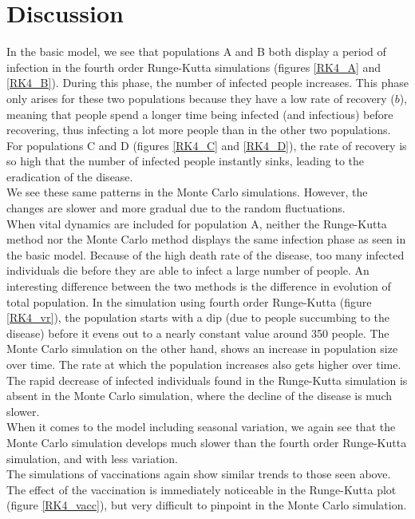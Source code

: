 \documentclass[notitlepage, reprint, nofootinbib]{revtex4-1}
\begin{document}
\section{Discussion}
In the basic model, we see that populations A and B both display a period of infection in the fourth order Runge-Kutta simulations (figures \ref{RK4_A} and \ref{RK4_B}). During this phase, the number of infected people increases. This phase only arises for these two populations because they have a low rate of recovery ($b$), meaning that people spend a longer time being infected (and infectious) before recovering, thus infecting a lot more people than in the other two populations. For populations C and D (figures \ref{RK4_C} and \ref{RK4_D}), the rate of recovery is so high that the number of infected people instantly sinks, leading to the eradication of the disease.\\[2mm]
We see these same patterns in the Monte Carlo simulations. However, the changes are slower and more gradual due to the random fluctuations.\\[2mm]
When vital dynamics are included for population A, neither the Runge-Kutta method nor the Monte Carlo method displays the same infection phase as seen in the basic model. Because of the high death rate of the disease, too many infected individuals die before they are able to infect a large number of people. An interesting difference between the two methods is the difference in evolution of total population. In the simulation using fourth order Runge-Kutta (figure \ref{RK4_vr}), the population starts with a dip (due to people succumbing to the disease) before it evens out to a nearly constant value around 350 people. The Monte Carlo simulation on the other hand, shows an increase in population size over time. The rate at which the population increases also gets higher over time. The rapid decrease of infected individuals found in the Runge-Kutta simulation is absent in the Monte Carlo simulation, where the decline of the disease is much slower.\\[2mm]
When it comes to the model including seasonal variation, we again see that the Monte Carlo simulation develops much slower than the fourth order Runge-Kutta simulation, and with less variation. \\[2mm]
The simulations of vaccinations again show similar trends to those seen above. The effect of the vaccination is immediately noticeable in the Runge-Kutta plot (figure \ref{RK4_vacc}), but very difficult to pinpoint in the Monte Carlo simulation. \\[2mm]
\end{document}

